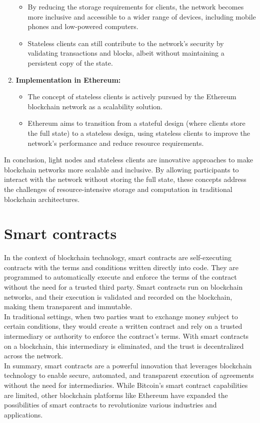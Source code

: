 \begin{enumerate}
\begin{itemize}
		\item By reducing the storage requirements for clients, the network becomes more inclusive and accessible to a wider range of devices, including mobile phones and low-powered computers.
		\item Stateless clients can still contribute to the network's security by validating transactions and blocks, albeit without maintaining a persistent copy of the state.
	\end{itemize}
	\item \textbf{Implementation in Ethereum:}
	\begin{itemize}
		\item The concept of stateless clients is actively pursued by the Ethereum blockchain network as a scalability solution.
		\item Ethereum aims to transition from a stateful design (where clients store the full state) to a stateless design, using stateless clients to improve the network's performance and reduce resource requirements.
	\end{itemize}
\end{enumerate}
In conclusion, light nodes and stateless clients are innovative approaches to make blockchain networks more scalable and inclusive. By allowing participants to interact with the network without storing the full state, these concepts address the challenges of resource-intensive storage and computation in traditional blockchain architectures.

\section{Smart contracts}
In the context of blockchain technology, smart contracts are self-executing contracts with the terms and conditions written directly into code. They are programmed to automatically execute and enforce the terms of the contract without the need for a trusted third party. Smart contracts run on blockchain networks, and their execution is validated and recorded on the blockchain, making them transparent and immutable.\\
In traditional settings, when two parties want to exchange money subject to certain conditions, they would create a written contract and rely on a trusted intermediary or authority to enforce the contract's terms. With smart contracts on a blockchain, this intermediary is eliminated, and the trust is decentralized across the network.\\
In summary, smart contracts are a powerful innovation that leverages blockchain technology to enable secure, automated, and transparent execution of agreements without the need for intermediaries. While Bitcoin's smart contract capabilities are limited, other blockchain platforms like Ethereum have expanded the possibilities of smart contracts to revolutionize various industries and applications.
